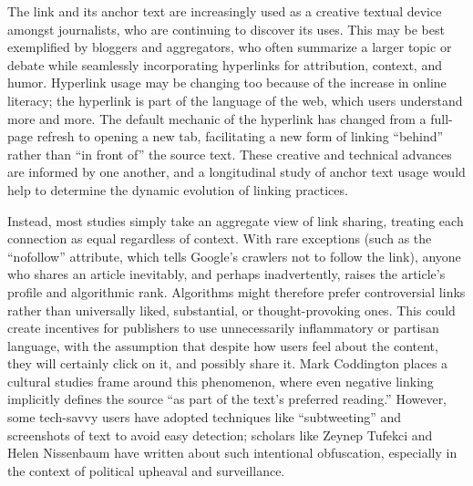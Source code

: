 The link and its anchor text are increasingly used as a creative textual device amongst journalists, who are continuing to discover its uses. This may be best exemplified by bloggers and aggregators, who often summarize a larger topic or debate while seamlessly incorporating hyperlinks for attribution, context, and humor. Hyperlink usage may be changing too because of the increase in online literacy; the hyperlink is part of the language of the web, which users understand more and more. The default mechanic of the hyperlink has changed from a full-page refresh to opening a new tab, facilitating a new form of linking ``behind'' rather than ``in front of'' the source text. These creative and technical advances are informed by one another, and a longitudinal study of anchor text usage would help to determine the dynamic evolution of linking practices.

Instead, most studies simply take an aggregate view of link sharing, treating each connection as equal regardless of context. With rare exceptions (such as the ``nofollow'' attribute, which tells Google's crawlers not to follow the link), anyone who shares an article inevitably, and perhaps inadvertently, raises the article's profile and algorithmic rank. Algorithms might therefore prefer controversial links rather than universally liked, substantial, or thought-provoking ones. This could create incentives for publishers to use unnecessarily inflammatory or partisan language, with the assumption that despite how users feel about the content, they will certainly click on it, and possibly share it. Mark Coddington places a cultural studies frame around this phenomenon, where even negative linking implicitly defines the source ``as part of the text's preferred reading.''\autocite{coddington_building_2012} However, some tech-savvy users have adopted techniques like ``subtweeting'' and screenshots of text to avoid easy detection; scholars like Zeynep Tufekci and Helen Nissenbaum have written about such intentional obfuscation, especially in the context of political upheaval and surveillance.\autocites{tufekci_big_2014}{zuckerman_helen_2014}


